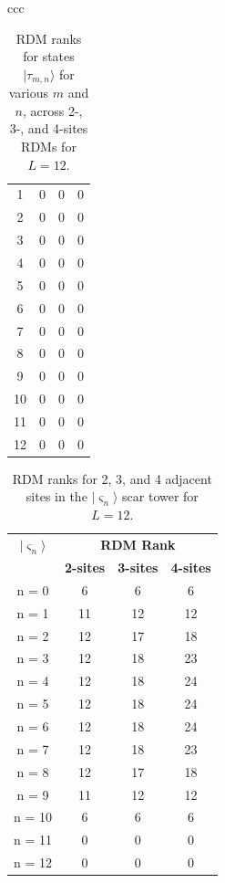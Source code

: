 \documentclass[11pt]{article}
\begin{document}
\begin{itemize}
\begin{itemize}
\begin{table}[H]
\begin{tabular}{ccc}
\begin{tabular}{|c|c|c|c|}
	1 & 0 & 0 & 0 \\
	2 & 0 & 0 & 0 \\
	3 & 0 & 0 & 0 \\
	4 & 0 & 0 & 0 \\
	5 & 0 & 0 & 0 \\
	6 & 0 & 0 & 0 \\
	7 & 0 & 0 & 0 \\
	8 & 0 & 0 & 0 \\
	9 & 0 & 0 & 0 \\
	10 & 0 & 0 & 0 \\
	11 & 0 & 0 & 0 \\
	12 & 0 & 0 & 0 \\
	\hline
\end{tabular}
\end{tabular}

\caption{RDM ranks for states $|\tau_{m,n}\rangle$ for various $m$ and $n$, across 2-, 3-, and 4-sites RDMs for $L=12$.}
\end{table}

	
\begin{table}[H]
	\centering
	\begin{tabular}{|c|ccc|}
	\hline
	\textbf{$|\varsigma_n\rangle$} & \multicolumn{3}{c|}{\textbf{RDM Rank}} \\
	\cline{2-4}
	& \textbf{2-sites} & \textbf{3-sites} & \textbf{4-sites}\\
	\hline
	 n = 0 & 6 & 6 & 6 \\
	 n = 1 & 11 & 12 & 12 \\
	 n = 2 & 12 & 17 & 18 \\
	 n = 3 & 12 & 18 & 23 \\
	 n = 4 & 12 & 18 & 24 \\  
	 n = 5 & 12 & 18 & 24 \\
	 n = 6 & 12 & 18 & 24 \\
	 n = 7 & 12 & 18 & 23 \\
	 n = 8 & 12 & 17 & 18 \\
	 n = 9 & 11 & 12 & 12 \\
	 n = 10 & 6 & 6 & 6 \\
	 n = 11 & 0 & 0 & 0 \\
	 n = 12 & 0 & 0 & 0 \\
	\hline
	\end{tabular}
	\caption{RDM ranks for 2, 3, and 4 adjacent sites in the $|\varsigma_n\rangle$ scar tower for $L=12$.}
	\label{tab:ranks22}
	\end{table}


\end{itemize}
\end{itemize}
\end{document}
